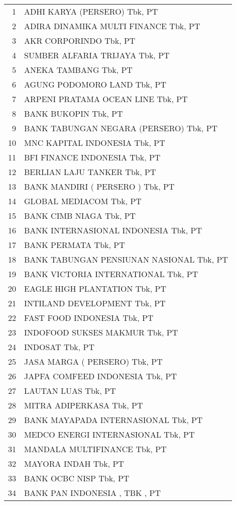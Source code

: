 \begin{longtable}{r l}
1 &  ADHI KARYA (PERSERO) Tbk, PT  \\
2 &  ADIRA DINAMIKA MULTI FINANCE Tbk, PT  \\
3 &  AKR CORPORINDO Tbk, PT  \\
4 &  SUMBER ALFARIA TRIJAYA Tbk, PT  \\
5 &  ANEKA TAMBANG Tbk, PT  \\
6 &  AGUNG PODOMORO LAND Tbk, PT  \\
7 &  ARPENI PRATAMA OCEAN LINE Tbk, PT  \\
8 &  BANK BUKOPIN Tbk, PT  \\
9 &  BANK TABUNGAN NEGARA (PERSERO) Tbk, PT  \\
10 &  MNC KAPITAL INDONESIA Tbk, PT  \\
11 &  BFI FINANCE INDONESIA Tbk, PT  \\
12 &  BERLIAN LAJU TANKER Tbk, PT  \\
13 &  BANK MANDIRI ( PERSERO ) Tbk, PT  \\
14 &  GLOBAL MEDIACOM Tbk, PT  \\
15 &  BANK CIMB NIAGA Tbk, PT  \\
16 &  BANK INTERNASIONAL INDONESIA Tbk, PT  \\
17 &  BANK PERMATA Tbk, PT  \\
18 &  BANK TABUNGAN PENSIUNAN NASIONAL Tbk, PT  \\
19 &  BANK VICTORIA INTERNATIONAL Tbk, PT  \\
20 &  EAGLE HIGH PLANTATION Tbk, PT  \\
21 &  INTILAND DEVELOPMENT Tbk, PT  \\
22 &  FAST FOOD INDONESIA Tbk, PT  \\
23 &  INDOFOOD SUKSES MAKMUR Tbk, PT  \\
24 &  INDOSAT Tbk, PT  \\
25 &  JASA MARGA ( PERSERO) Tbk, PT  \\
26 &  JAPFA COMFEED INDONESIA Tbk, PT  \\
27 &  LAUTAN LUAS Tbk, PT  \\
28 &  MITRA ADIPERKASA Tbk, PT  \\
29 &  BANK MAYAPADA INTERNASIONAL Tbk, PT  \\
30 &  MEDCO ENERGI INTERNASIONAL Tbk, PT  \\
31 &  MANDALA MULTIFINANCE Tbk, PT  \\
32 &  MAYORA INDAH Tbk, PT  \\
33 &  BANK OCBC NISP Tbk, PT  \\
34 &  BANK PAN INDONESIA , TBK , PT  \\

\end{longtable}
